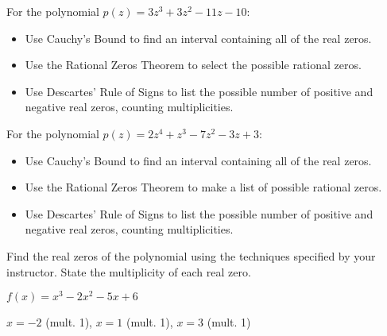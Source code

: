 \documentclass{ximera}
\begin{document}
\begin{problem}
For the polynomial $p(z) = 3z^{3} + 3z^{2} - 11z - 10$:

\begin{itemize}
\item  Use Cauchy's Bound to find an interval containing all of the real zeros.
\item  Use the Rational Zeros Theorem to select the possible rational zeros.
\begin{selectAll}
  \end{selectAll}
\item  Use Descartes' Rule of Signs to list the possible number of positive and negative real zeros, counting multiplicities.
\end{itemize}
\end{problem}

\begin{problem}\label{prelimpolystufflast}
For the polynomial $p(z) = 2z^4+z^3-7z^2-3z+3$:

\begin{itemize}
\item  Use Cauchy's Bound to find an interval containing all of the real zeros.
\item  Use the Rational Zeros Theorem to make a list of possible rational zeros.

\begin{selectAll}
  \end{selectAll}
  
  
\item  Use Descartes' Rule of Signs to list the possible number of positive and negative real zeros, counting multiplicities.
\end{itemize}
\end{problem}

\begin{problem}\label{findrealzerosexerfirst}
Find the real zeros of the polynomial using the techniques specified by your instructor.  State the multiplicity of each real zero.

$f(x) = x^{3} - 2x^{2} - 5x + 6$

\begin{solution}
$x = -2$ (mult. 1), $x = 1$ (mult. 1), $x = 3$ (mult. 1)     
\end{solution}

\end{problem}
\end{document}
